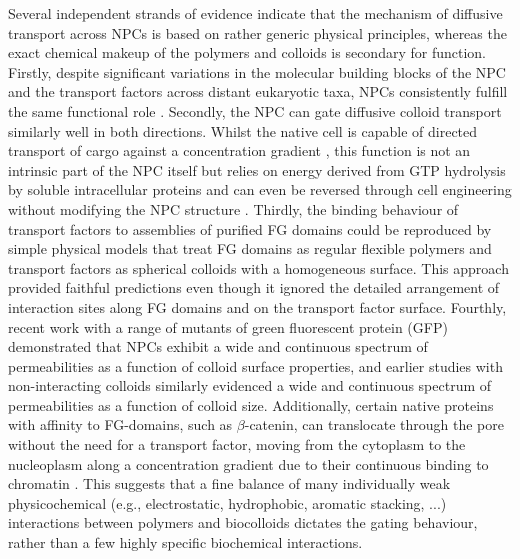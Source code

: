 \documentclass[12pt, a4paper]{article}
\begin{document}
Several independent strands of evidence indicate that the mechanism of diffusive transport across NPCs is based on rather generic physical principles, whereas the exact chemical makeup of the polymers and colloids is secondary for function.
Firstly, despite significant variations in the molecular building blocks of the NPC and the transport factors across distant eukaryotic taxa, NPCs consistently fulfill the same functional role \cite{DeGrasse2009, Maimon2012, Ori2013, Hayama2017, Yaron2018, Holzer2018}.
Secondly, the NPC can gate diffusive colloid transport similarly well in both directions.
Whilst the native cell is capable of directed transport of cargo against a concentration gradient \cite{Rout2003, Tijana2017}, this function is not an intrinsic part of the NPC itself but relies on energy derived from GTP hydrolysis by soluble intracellular proteins \cite{Lowe2015, Yang2004} and can even be reversed through cell engineering without modifying the NPC structure \cite{Nachury1999, Sakiyama2016}.
Thirdly, the binding behaviour of transport factors to assemblies of purified FG domains could be reproduced by simple physical models that treat FG domains as regular flexible polymers and transport factors as spherical colloids with a homogeneous surface. This approach provided faithful predictions even though it ignored the detailed arrangement of interaction sites along FG domains and on the transport factor surface. 
Fourthly, recent work with a range of mutants of green fluorescent protein (GFP) demonstrated that NPCs exhibit a wide and continuous spectrum of permeabilities as a function of colloid surface properties, and earlier studies with non-interacting colloids similarly evidenced a wide and continuous spectrum of permeabilities as a function of colloid size.
Additionally, certain native proteins with affinity to FG-domains, such as $\beta$-catenin, can translocate through the pore without the need for a transport factor, moving from the cytoplasm to the nucleoplasm along a concentration gradient due to their continuous binding to chromatin \cite{Rout2003}. This suggests that a fine balance of many individually weak physicochemical (e.g., electrostatic, hydrophobic, aromatic stacking, ...) interactions between polymers and biocolloids dictates the gating behaviour, rather than a few highly specific biochemical interactions.

\end{document}
